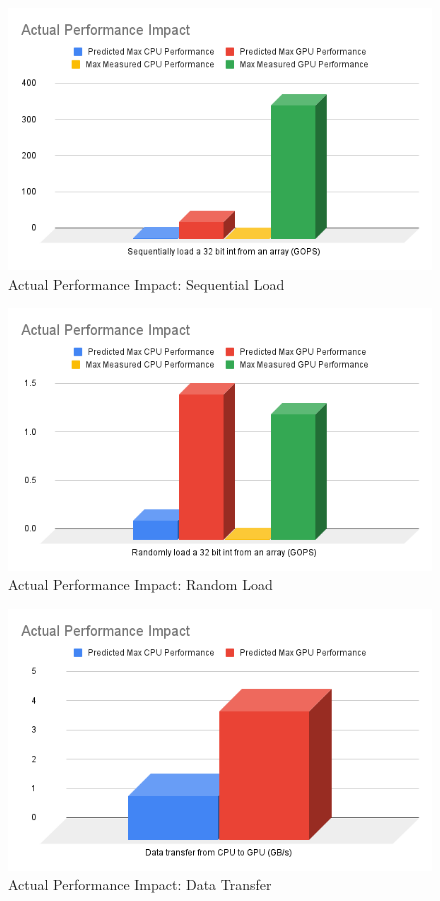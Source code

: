 \documentclass{article}
\begin{document}
\begin{figure}[h!t]
    \centering
    \includegraphics[width=1\textwidth]{sequential.png}
    \caption{Actual Performance Impact: Sequential Load}
    \label{fig:sequential}
\end{figure}

\begin{figure}[h!t]
    \centering
    \includegraphics[width=1\textwidth]{random.png}
    \caption{Actual Performance Impact: Random Load}
    \label{fig:random}
\end{figure}

\begin{figure}[h!t]
    \centering
    \includegraphics[width=1\textwidth]{dataTransfer.png}
    \caption{Actual Performance Impact: Data Transfer}
    \label{fig:transfer}
\end{figure}
\end{document}
